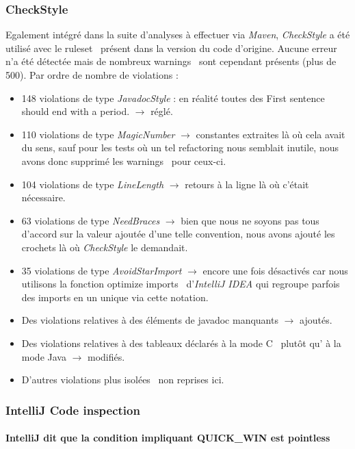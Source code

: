 \documentclass[12pt, openany]{report}
\begin{document}
\subsubsection{CheckStyle}
Egalement intégré dans la suite d'analyses à effectuer via \textit{Maven}, \textit{CheckStyle} a été utilisé avec le \og ruleset \fg \, présent dans la version du code d'origine.
Aucune erreur n'a été détectée mais de nombreux \og warnings \fg \, sont cependant présents (plus de 500). Par ordre de nombre de \og violations \fg :
\begin{itemize}
	\item 148 violations de type \textit{JavadocStyle} : en réalité toutes des \og First sentence should end with a period. \fg $\rightarrow$ réglé. 
	\item 110 violations de type \textit{MagicNumber} $\rightarrow$ constantes extraites là où cela avait du sens, sauf pour les tests où un tel refactoring nous semblait inutile, nous avons donc supprimé les \og warnings \fg \, pour ceux-ci.
	\item 104 violations de type \textit{LineLength} $\rightarrow$ retours à la ligne là où c'était nécessaire.
	\item 63 violations de type \textit{NeedBraces} $\rightarrow$ bien que nous ne soyons pas tous d'accord sur la valeur ajoutée d'une telle convention, nous avons ajouté les crochets là où \textit{CheckStyle} le demandait.
	\item 35 violations de type \textit{AvoidStarImport} $\rightarrow$ encore une fois désactivés car nous utilisons la fonction \og optimize imports \fg \, d'\textit{IntelliJ IDEA} qui regroupe parfois des imports en un unique via cette notation.
	\item Des violations relatives à des éléments de javadoc manquants $\rightarrow$ ajoutés.
	\item Des violations relatives à des tableaux déclarés à la \og mode C \fg \, plutôt qu' à la \og mode Java \fg $\rightarrow$ modifiés.
	\item D'autres violations plus \og isolées \fg \, non reprises ici.
\end{itemize}

\subsubsection{IntelliJ Code inspection}
\paragraph{IntelliJ dit que la condition impliquant QUICK\_WIN est \og pointless \fg} 
\end{document}
